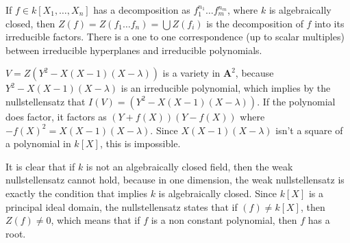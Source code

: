\begin{corollary}
    If $f \in k[X_1, \dots, X_n]$ has a decomposition as $f_1^{n_1} \dots f_m^{n_m}$, where $k$ is algebraically closed, then $Z(f) = Z(f_1 \dots f_n) = \bigcup Z(f_i)$ is the decomposition of $f$ into its irreducible factors. There is a one to one correspondence (up to scalar multiples) between irreducible hyperplanes and irreducible polynomials.
\end{corollary}

\begin{example}
    $V = Z(Y^2 - X(X-1)(X-\lambda))$ is a variety in $\mathbf{A}^2$, because $Y^2 - X(X-1)(X-\lambda)$ is an irreducible polynomial, which implies by the nullstellensatz that $I(V) = (Y^2 - X(X-1)(X - \lambda))$. If the polynomial does factor, it factors as $(Y + f(X))(Y - f(X))$ where $-f(X)^2 = X(X-1)(X-\lambda)$. Since $X(X-1)(X-\lambda)$ isn't a square of a polynomial in $k[X]$, this is impossible. 
\end{example}

It is clear that if $k$ is not an algebraically closed field, then the weak nullstellensatz cannot hold, because in one dimension, the weak nullstellensatz is exactly the condition that implies $k$ is algebraically closed. Since $k[X]$ is a principal ideal domain, the nullstellensatz states that if $(f) \neq k[X]$, then $Z(f) \neq 0$, which means that if $f$ is a non constant polynomial, then $f$ has a root.


